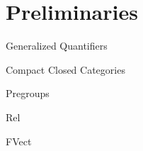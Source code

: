 \section{Preliminaries}
\label{prelim}


Generalized Quantifiers


Compact Closed Categories

Pregroups

Rel

FVect